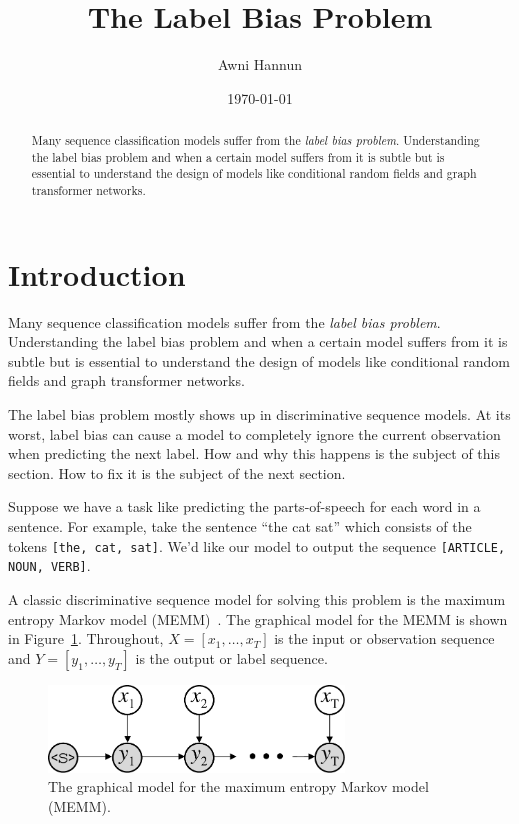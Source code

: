 \documentclass[11pt, letterpaper]{article}
\title{The Label Bias Problem}
\author{Awni Hannun}
\date{\today}
\begin{document}
\maketitle

\begin{abstract}
Many sequence classification models suffer from the \emph{label bias problem}.
Understanding the label bias problem and when a certain model suffers from it
is subtle but is essential to understand the design of models like conditional
random fields and graph transformer networks.
\end{abstract}

\section{Introduction}

Many sequence classification models suffer from the \emph{label bias problem}.
Understanding the label bias problem and when a certain model suffers from it
is subtle but is essential to understand the design of models like conditional
random fields and graph transformer networks.

The label bias problem mostly shows up in discriminative sequence models. At
its worst, label bias can cause a model to completely ignore the current
observation when predicting the next label. How and why this happens is the
subject of this section. How to fix it is the subject of the next section.

Suppose we have a task like predicting the parts-of-speech for each word in a
sentence. For example, take the sentence ``the cat sat'' which consists of
the tokens \texttt{[the, cat, sat]}. We'd like our model to output the sequence
\texttt{[ARTICLE, NOUN, VERB]}.

A classic discriminative sequence model for solving this problem is the maximum
entropy Markov model (MEMM)~\citep{mccallum2000}. The graphical model for the
MEMM is shown in Figure~\ref{fig:memm}. Throughout, $X\!=\![x_1, \ldots, x_T]$
is the input or observation sequence and $Y\!=\![y_1, \ldots, y_T]$ is the
output or label sequence.

\begin{figure}
    \centering
    \includegraphics[width=0.7\textwidth]{figures/memm.pdf}
    \caption{The graphical model for the maximum entropy Markov model (MEMM).}
    \label{fig:memm}
\end{figure}
\end{document}

